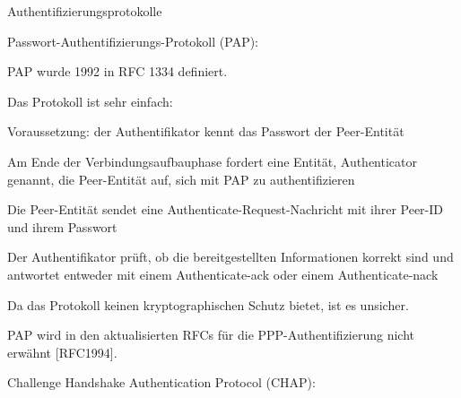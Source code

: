 \documentclass[a4paper]{article}
\begin{document}
\begin{multicols}{3}
      Authentifizierungsprotokolle

      \begin{itemize*}
            \item
            Passwort-Authentifizierungs-Protokoll (PAP):

            \begin{itemize*}
                  \item PAP wurde 1992 in RFC 1334 definiert.
                  \item Das Protokoll ist sehr einfach:
                  \begin{itemize*} \item Voraussetzung: der Authentifikator kennt das Passwort der Peer-Entität \item Am Ende der Verbindungsaufbauphase fordert eine Entität, Authenticator genannt, die Peer-Entität auf, sich mit PAP zu authentifizieren \item Die Peer-Entität sendet eine Authenticate-Request-Nachricht mit ihrer Peer-ID und ihrem Passwort \item Der Authentifikator prüft, ob die bereitgestellten Informationen korrekt sind und antwortet entweder mit einem Authenticate-ack oder einem Authenticate-nack \end{itemize*}
                  \item Da das Protokoll keinen kryptographischen Schutz bietet, ist es unsicher.
                  \item PAP wird in den aktualisierten RFCs für die PPP-Authentifizierung nicht erwähnt {[}RFC1994{]}.
            \end{itemize*}
            \item
            Challenge Handshake Authentication Protocol (CHAP):


\end{itemize*}
\end{multicols}
\end{document}
